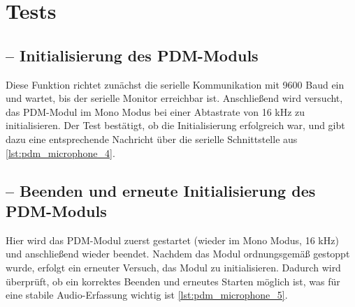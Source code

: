 {
	\label{lst:pdm_microphone_3}
}
	
\section{Tests}



\subsection{ – Initialisierung des PDM-Moduls}
Diese Funktion richtet zunächst die serielle Kommunikation mit 9600 Baud ein und wartet, bis der serielle Monitor erreichbar ist. Anschließend wird versucht, das PDM-Modul im Mono Modus bei einer Abtastrate von 16 kHz zu initialisieren. Der Test bestätigt, ob die Initialisierung erfolgreich war, und gibt dazu eine entsprechende Nachricht über die serielle Schnittstelle aus \ref{lst:pdm_microphone_4}.

{
	\label{lst:pdm_microphone_4}
}

\subsection{ – Beenden und erneute Initialisierung des PDM-Moduls}
Hier wird das PDM-Modul zuerst gestartet (wieder im Mono Modus, 16 kHz) und anschließend wieder beendet. Nachdem das Modul ordnungsgemäß gestoppt wurde, erfolgt ein erneuter Versuch, das Modul zu initialisieren. Dadurch wird überprüft, ob ein korrektes Beenden und erneutes Starten möglich ist, was für eine stabile Audio-Erfassung wichtig ist \ref{lst:pdm_microphone_5}.

{
	\label{lst:pdm_microphone_5}
}

